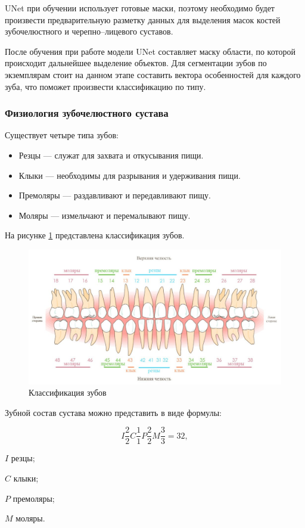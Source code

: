 UNet при обучении использует готовые маски, поэтому необходимо будет произвести предварительную разметку данных для выделения масок костей зубочелюстного и черепно--лицевого суставов.

После обучения при работе модели UNet составляет маску области, по которой происходит дальнейшее выделение объектов. Для сегментации зубов по экземплярам стоит на данном этапе составить вектора особенностей для каждого зуба, что поможет произвести классификацию по типу.

\subsubsection{Физиология зубочелюстного сустава}

Существует четыре типа зубов:
\begin{itemize}
	\item Резцы --- служат для захвата и откусывания пищи.
	\item Клыки --- необходимы для разрывания и удерживания пищи.
	\item Премоляры --- раздавливают и передавливают пищу.
	\item Моляры --- измельчают и перемалывают пищу.
\end{itemize}

На рисунке \ref{fig:teeth} представлена классификация зубов.

\begin{figure}[H]
	\centering
	\includegraphics[width=\textwidth]{img/teeth.jpeg}
	\caption{Классификация зубов}
	\label{fig:teeth}
\end{figure}

Зубной состав сустава можно представить в виде формулы:

\begin{equation}
	\label{eq:teeth}
	I\frac{2}{2}C\frac{1}{1}P\frac{2}{2}M\frac{3}{3} = 32,
\end{equation}
\begin{eqexpl}[15mm]
	\item{$I$} резцы;
	\item{$C$} клыки;
	\item{$P$} премоляры;
	\item{$M$} моляры.
\end{eqexpl}

